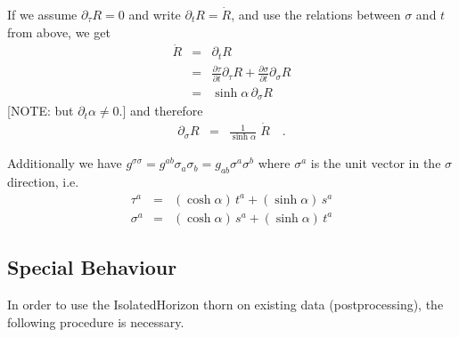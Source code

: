 If we assume $\partial_\tau R = 0$ and write $\partial_t R = \dot R$,
and use the relations between $\sigma$ and $t$ from above, we get
\begin{eqnarray}
   \dot R & = & \partial_t R
\\
   & = & \frac{\partial \tau}{\partial t} \partial_\tau R +
   \frac{\partial \sigma}{\partial t} \partial_\sigma R
\\
   & = & \sinh \alpha\, \partial_\sigma R
\end{eqnarray}
[NOTE: but $\partial_t \alpha \ne 0$.]
and therefore
\begin{eqnarray}
   \partial_\sigma R & = & \frac{1}{\sinh \alpha}\; \dot R
   \quad\textrm{.}
\end{eqnarray}

Additionally we have $g^{\sigma\sigma} = g^{ab} \sigma_a \sigma_b =
g_{ab} \sigma^a \sigma^b$ where $\sigma^a$ is the unit vector in the
$\sigma$ direction, i.e.\
\begin{eqnarray}
   \tau^a   & = & (\cosh \alpha)\, t^a + (\sinh \alpha)\, s^a
\\
   \sigma^a & = & (\cosh \alpha)\, s^a + (\sinh \alpha)\, t^a
\end{eqnarray}



\subsection{Special Behaviour}

In order to use the IsolatedHorizon thorn on existing data
(postprocessing), the following procedure is necessary.


